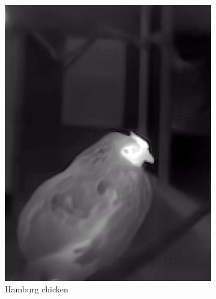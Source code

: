 \documentclass{l4proj}
\begin{document}
\begin{figure}[ht]
\begin{subfigure}[h!]{0.18\textwidth}
    \includegraphics[width=\textwidth, trim={0cm 2.5cm 0cm 2.5cm}, clip]{images/dataset/pretty_chicken/lwir.png}
    \caption{Hamburg chicken}
  \end{subfigure}
  \begin{subfigure}[h!]{0.18\textwidth}

\end{subfigure}
\end{figure}
\end{document}
